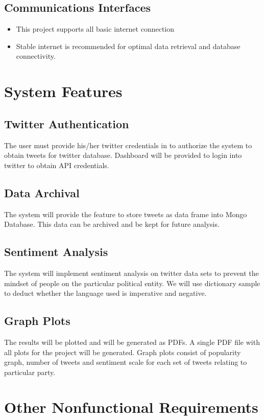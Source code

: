 \documentclass{scrreprt}
\begin{document}
\section{Communications Interfaces}
\begin{itemize}
	\item This project supports all basic internet connection
	\item Stable internet is recommended for optimal data retrieval and database connectivity.
\end{itemize}


\chapter{System Features}

\section{Twitter Authentication}
The user must provide his/her twitter credentials in to authorize the system to obtain tweets for twitter database.
Dashboard will be provided to login into twitter to obtain API credentials.

\section{Data Archival}
The system will provide the feature to store tweets as data frame into Mongo Database.
This data can be archived and be kept for future analysis.

\section{Sentiment Analysis}
The system will implement sentiment analysis on twitter data sets to prevent the mindset of people on the particular political entity.
We will use dictionary sample to deduct whether the language used is imperative and negative.

\section{Graph Plots}
The results will be plotted and will be generated as PDFs. A single PDF file with all plots for the project will be generated.
Graph plots consist of popularity graph, number of tweets and sentiment scale for each set of tweets relating to particular party.

\chapter{Other Nonfunctional Requirements}
\end{document}
